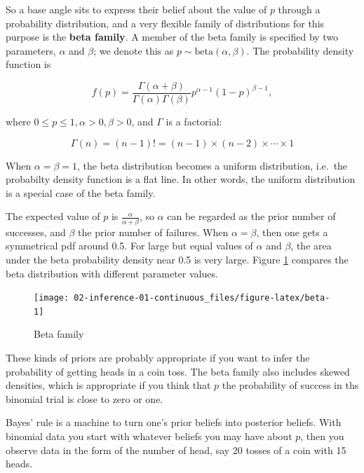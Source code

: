 \documentclass[]{book}
\theoremstyle{definition}
\theoremstyle{definition}
\theoremstyle{definition}
\theoremstyle{remark}
\begin{document}
So a base angle sits to express their belief about the value of \(p\)
through a probability distribution, and a very flexible family of
distributions for this purpose is the \textbf{beta family}. A member of
the beta family is specified by two parameters, \(\alpha\) and
\(\beta\); we denote this as \(p \sim \text{beta}(\alpha, \beta)\). The
probability density function is

\begin{equation}
f(p) = \frac{\Gamma(\alpha+\beta)}{\Gamma(\alpha)\Gamma(\beta)} p^{\alpha-1} (1-p)^{\beta-1},
\label{eq:beta}
\end{equation}

where \(0 \leq p \leq 1, \alpha>0, \beta>0\), and \(\Gamma\) is a
factorial:

\[\Gamma(n) = (n-1)! = (n-1) \times (n-2) \times \cdots \times 1\]

When \(\alpha=\beta=1\), the beta distribution becomes a uniform
distribution, i.e.~the probabilty density function is a flat line. In
other words, the uniform distribution is a special case of the beta
family.

The expected value of \(p\) is \(\frac{\alpha}{\alpha+\beta}\), so
\(\alpha\) can be regarded as the prior number of successes, and
\(\beta\) the prior number of failures. When \(\alpha=\beta\), then one
gets a symmetrical pdf around 0.5. For large but equal values of
\(\alpha\) and \(\beta\), the area under the beta probability density
near 0.5 is very large. Figure \ref{fig:beta} compares the beta
distribution with different parameter values.

\begin{figure}

{\centering \texttt{[image: 02-inference-01-continuous\_files/figure-latex/beta-1]} 

}

\caption{Beta family}\label{fig:beta}
\end{figure}

These kinds of priors are probably appropriate if you want to infer the
probability of getting heads in a coin toss. The beta family also
includes skewed densities, which is appropriate if you think that \(p\)
the probability of success in ths binomial trial is close to zero or
one.

Bayes' rule is a machine to turn one's prior beliefs into posterior
beliefs. With binomial data you start with whatever beliefs you may have
about \(p\), then you observe data in the form of the number of head,
say 20 tosses of a coin with 15 heads.
\end{document}
